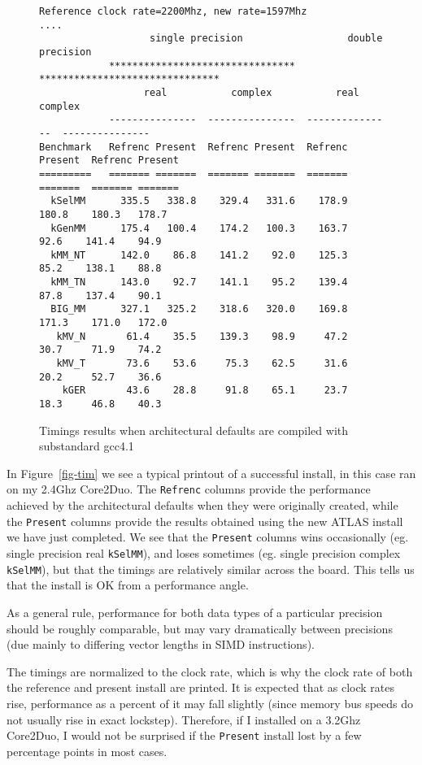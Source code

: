 \documentclass[11pt]{article}
\begin{document}
\begin{figure}[p]
\begin{footnotesize}
\begin{verbatim}
Reference clock rate=2200Mhz, new rate=1597Mhz
....
                   single precision                  double precision
            ********************************   *******************************
                  real           complex           real           complex
            ---------------  ---------------  ---------------  ---------------
Benchmark   Refrenc Present  Refrenc Present  Refrenc Present  Refrenc Present
=========   ======= =======  ======= =======  ======= =======  ======= =======
  kSelMM      335.5   338.8    329.4   331.6    178.9   180.8    180.3   178.7
  kGenMM      175.4   100.4    174.2   100.3    163.7    92.6    141.4    94.9
  kMM_NT      142.0    86.8    141.2    92.0    125.3    85.2    138.1    88.8
  kMM_TN      143.0    92.7    141.1    95.2    139.4    87.8    137.4    90.1
  BIG_MM      327.1   325.2    318.6   320.0    169.8   171.3    171.0   172.0
   kMV_N       61.4    35.5    139.3    98.9     47.2    30.7     71.9    74.2
   kMV_T       73.6    53.6     75.3    62.5     31.6    20.2     52.7    36.6
    kGER       43.6    28.8     91.8    65.1     23.7    18.3     46.8    40.3
\end{verbatim}
\end{footnotesize}
\caption{Timings results when architectural defaults are compiled with 
         substandard gcc4.1}
\label{fig-tim-gcc4}
\end{figure}

In Figure~\ref{fig-tim} we see a typical printout of a successful install,
in this case ran on my 2.4Ghz Core2Duo.
The {\tt Refrenc} 
columns provide the performance achieved by the architectural defaults when
they were
originally created, while the  {\tt Present} columns provide the results
obtained using the new ATLAS install we have just completed.  We see that
the {\tt Present} columns wins occasionally (eg. single precision real
{\tt kSelMM}), and loses sometimes (eg. single precision complex {\tt kSelMM}),
but that the timings are relatively similar across the board.  This tells
us that the install is OK from a performance angle.

As a general rule, performance for both data types of a particular precision
should be roughly comparable, but may vary dramatically between precisions
(due mainly to differing vector lengths in SIMD instructions).

The timings are normalized to the clock rate, which is why the clock rate
of both the reference and present install are printed.  It is expected that
as clock rates rise, performance as a percent of it may fall slightly
(since memory bus speeds do not usually rise in exact lockstep).  Therefore,
if I installed on a 3.2Ghz Core2Duo, I would not be surprised if the 
{\tt Present} install lost by a few percentage points in most cases.
\end{document}
